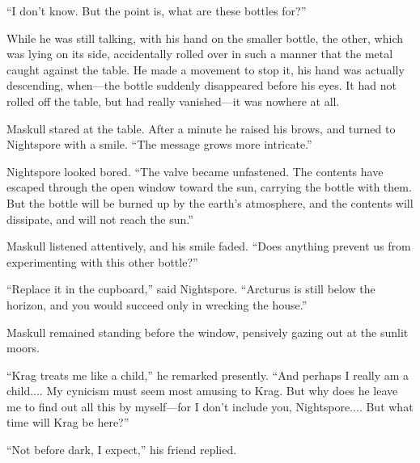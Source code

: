 ``I don't know. But the point is, what are these bottles for?''

While he was still talking, with his hand on the smaller bottle, the other, which was lying on its side, accidentally rolled over in such a manner that the metal caught against the table. He made a movement to stop it, his hand was actually descending, when—the bottle suddenly disappeared before his eyes. It had not rolled off the table, but had really vanished—it was nowhere at all.

Maskull stared at the table. After a minute he raised his brows, and turned to Nightspore with a smile. ``The message grows more intricate.''

Nightspore looked bored. ``The valve became unfastened. The contents have escaped through the open window toward the sun, carrying the bottle with them. But the bottle will be burned up by the earth's atmosphere, and the contents will dissipate, and will not reach the sun.''

Maskull listened attentively, and his smile faded. ``Does anything prevent us from experimenting with this other bottle?''

``Replace it in the cupboard,'' said Nightspore. ``Arcturus is still below the horizon, and you would succeed only in wrecking the house.''

Maskull remained standing before the window, pensively gazing out at the sunlit moors.

``Krag treats me like a child,'' he remarked presently. ``And perhaps I really am a child.... My cynicism must seem most amusing to Krag. But why does he leave me to find out all this by myself—for I don't include you, Nightspore.... But what time will Krag be here?''

``Not before dark, I expect,'' his friend replied.

\chapterend